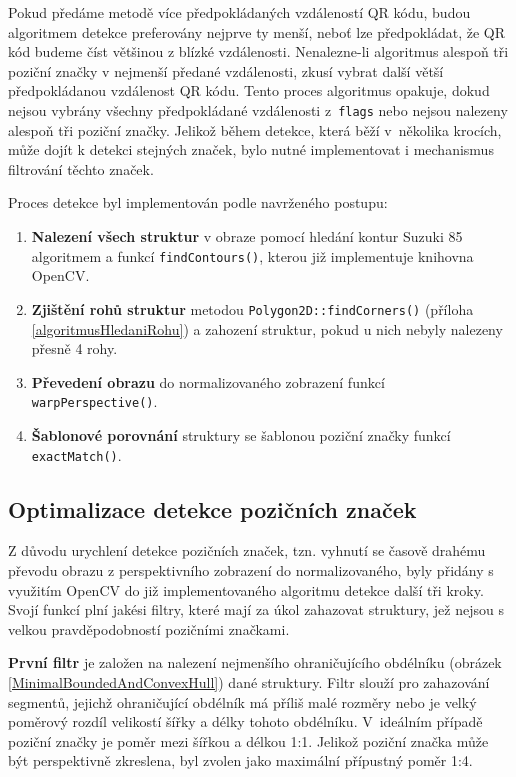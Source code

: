 Pokud předáme metodě více předpokládaných vzdáleností QR kódu, budou algoritmem
detekce preferovány nejprve ty menší, neboť lze předpokládat, že QR kód budeme
číst většinou z blízké vzdálenosti. Nenalezne-li algoritmus alespoň tři poziční
značky v nejmenší předané vzdálenosti, zkusí vybrat další větší předpokládanou
vzdálenost QR kódu. Tento proces algoritmus opakuje, dokud nejsou vybrány
všechny předpokládané vzdálenosti z~\texttt{flags} nebo nejsou nalezeny alespoň
tři poziční značky. Jelikož během detekce, která běží v~několika krocích, může
dojít k detekci stejných značek, bylo nutné implementovat i mechanismus filtrování
těchto značek.

\bigskip \noindent Proces detekce byl implementován podle navrženého postupu:

\begin{enumerate}
  \item \textbf{Nalezení všech struktur} v obraze pomocí hledání kontur Suzuki
  85 algoritmem a funkcí \texttt{findContours()}, kterou již implementuje
  knihovna OpenCV.
  \item \textbf{Zjištění rohů struktur} metodou
  \texttt{Polygon2D::findCorners()} (příloha \ref{algoritmusHledaniRohu}) a zahození struktur,
  pokud u nich nebyly nalezeny přesně 4 rohy.
  \item \textbf{Převedení obrazu} do normalizovaného zobrazení funkcí
  \texttt{warpPerspective()}.
  \item \textbf{Šablonové porovnání} struktury se šablonou poziční značky funkcí
  \texttt{exactMatch()}.
\end{enumerate}

\subsection{Optimalizace detekce pozičních značek}
\label{optimalizaceDetekce}

Z důvodu urychlení detekce pozičních značek, tzn. vyhnutí se časově drahému převodu obrazu z perspektivního zobrazení do normalizovaného, byly přidány s využitím OpenCV do již implementovaného algoritmu detekce další tři kroky. Svojí funkcí plní jakési filtry, které mají za úkol zahazovat struktury, jež nejsou s velkou pravděpodobností pozičními značkami.

\textbf{První filtr} je založen na nalezení nejmenšího ohraničujícího obdélníku
(obrázek \ref{MinimalBoundedAndConvexHull}) dané struktury. Filtr slouží pro
zahazování segmentů, jejichž ohraničující obdélník má příliš malé rozměry nebo je velký poměrový rozdíl
velikostí šířky a délky tohoto obdélníku. V~ideálním případě poziční značky
je poměr mezi šířkou a délkou 1:1. Jelikož poziční značka může být
perspektivně zkreslena, byl zvolen jako maximální přípustný poměr 1:4.
 
